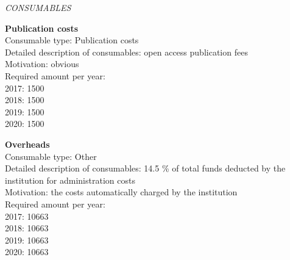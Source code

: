 \documentclass[11pt,dvipsnames,usenames,a4paper]{article}
\begin{document}

{\it CONSUMABLES}










{\bf Publication costs}\\
Consumable type: Publication costs\\
Detailed description of consumables: open access publication fees\\
Motivation: obvious\\
Required amount per year:\\
2017: 1500\\
2018: 1500\\
2019: 1500\\
2020: 1500


{\bf Overheads}\\
Consumable type: Other\\
Detailed description of consumables: 14.5 \% of total funds deducted by the institution for administration costs\\
Motivation: the costs automatically charged by the institution \\
Required amount per year:\\
2017: 10663\\
2018: 10663\\
2019: 10663\\
2020: 10663
\end{document}
